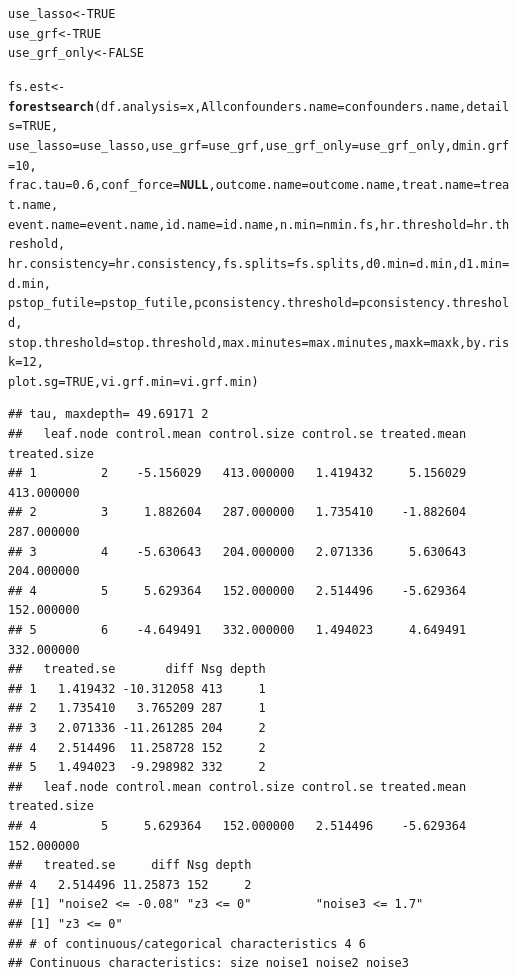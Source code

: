 \documentclass[smallextended]{svjour3}
\makeatletter
\newcommand{\hlnum}[1]{\textcolor[rgb]{0.686,0.059,0.569}{#1}}%
\newcommand{\hlstd}[1]{\textcolor[rgb]{0.345,0.345,0.345}{#1}}%
\newcommand{\hlkwa}[1]{\textcolor[rgb]{0.161,0.373,0.58}{\textbf{#1}}}%
\newcommand{\hlkwb}[1]{\textcolor[rgb]{0.69,0.353,0.396}{#1}}%
\newcommand{\hlkwc}[1]{\textcolor[rgb]{0.333,0.667,0.333}{#1}}%
\newcommand{\hlkwd}[1]{\textcolor[rgb]{0.737,0.353,0.396}{\textbf{#1}}}%
\newenvironment{kframe}{%
 \def\at@end@of@kframe{}%
 \ifinner\ifhmode%
  \def\at@end@of@kframe{\end{minipage}}%
  \begin{minipage}{\columnwidth}%
 \fi\fi%
 \def\FrameCommand##1{\hskip\@totalleftmargin \hskip-\fboxsep
 \colorbox{shadecolor}{##1}\hskip-\fboxsep
     \hskip-\linewidth \hskip-\@totalleftmargin \hskip\columnwidth}%
 \MakeFramed {\advance\hsize-\width
   \@totalleftmargin\z@ \linewidth\hsize
   \@setminipage}}%
 {\par\unskip\endMakeFramed%
 \at@end@of@kframe}
\newenvironment{knitrout}{}{} %
\makeatother
\begin{document}
\begin{knitrout}
\begin{kframe}
\begin{alltt}
\hlstd{use_lasso} \hlkwb{<-} \hlnum{TRUE}
\hlstd{use_grf} \hlkwb{<-} \hlnum{TRUE}
\hlstd{use_grf_only} \hlkwb{<-} \hlnum{FALSE}

\hlstd{fs.est} \hlkwb{<-} \hlkwd{forestsearch}\hlstd{(}\hlkwc{df.analysis} \hlstd{= x,} \hlkwc{Allconfounders.name} \hlstd{= confounders.name,} \hlkwc{details} \hlstd{=} \hlnum{TRUE}\hlstd{,}
    \hlkwc{use_lasso} \hlstd{= use_lasso,} \hlkwc{use_grf} \hlstd{= use_grf,} \hlkwc{use_grf_only} \hlstd{= use_grf_only,} \hlkwc{dmin.grf} \hlstd{=} \hlnum{10}\hlstd{,}
    \hlkwc{frac.tau} \hlstd{=} \hlnum{0.6}\hlstd{,} \hlkwc{conf_force} \hlstd{=} \hlkwa{NULL}\hlstd{,} \hlkwc{outcome.name} \hlstd{= outcome.name,} \hlkwc{treat.name} \hlstd{= treat.name,}
    \hlkwc{event.name} \hlstd{= event.name,} \hlkwc{id.name} \hlstd{= id.name,} \hlkwc{n.min} \hlstd{= nmin.fs,} \hlkwc{hr.threshold} \hlstd{= hr.threshold,}
    \hlkwc{hr.consistency} \hlstd{= hr.consistency,} \hlkwc{fs.splits} \hlstd{= fs.splits,} \hlkwc{d0.min} \hlstd{= d.min,} \hlkwc{d1.min} \hlstd{= d.min,}
    \hlkwc{pstop_futile} \hlstd{= pstop_futile,} \hlkwc{pconsistency.threshold} \hlstd{= pconsistency.threshold,}
    \hlkwc{stop.threshold} \hlstd{= stop.threshold,} \hlkwc{max.minutes} \hlstd{= max.minutes,} \hlkwc{maxk} \hlstd{= maxk,} \hlkwc{by.risk} \hlstd{=} \hlnum{12}\hlstd{,}
    \hlkwc{plot.sg} \hlstd{=} \hlnum{TRUE}\hlstd{,} \hlkwc{vi.grf.min} \hlstd{= vi.grf.min)}
\end{alltt}
\begin{verbatim}
## tau, maxdepth= 49.69171 2 
##   leaf.node control.mean control.size control.se treated.mean treated.size
## 1         2    -5.156029   413.000000   1.419432     5.156029   413.000000
## 2         3     1.882604   287.000000   1.735410    -1.882604   287.000000
## 3         4    -5.630643   204.000000   2.071336     5.630643   204.000000
## 4         5     5.629364   152.000000   2.514496    -5.629364   152.000000
## 5         6    -4.649491   332.000000   1.494023     4.649491   332.000000
##   treated.se       diff Nsg depth
## 1   1.419432 -10.312058 413     1
## 2   1.735410   3.765209 287     1
## 3   2.071336 -11.261285 204     2
## 4   2.514496  11.258728 152     2
## 5   1.494023  -9.298982 332     2
##   leaf.node control.mean control.size control.se treated.mean treated.size
## 4         5     5.629364   152.000000   2.514496    -5.629364   152.000000
##   treated.se     diff Nsg depth
## 4   2.514496 11.25873 152     2
## [1] "noise2 <= -0.08" "z3 <= 0"         "noise3 <= 1.7"  
## [1] "z3 <= 0"
## # of continuous/categorical characteristics 4 6 
## Continuous characteristics: size noise1 noise2 noise3 

\end{verbatim}
\end{kframe}
\end{knitrout}
\end{document}
